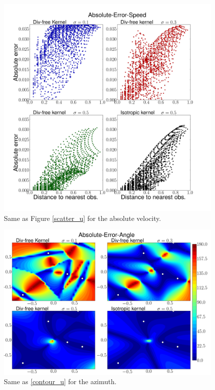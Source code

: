 \documentclass[12pt,a4paper]{article}%
\begin{document}
\begin{figure}
\noindent\includegraphics[width=36pc]{plots/Absolute-Error-Speed-scatter.png}
\caption{Same as Figure \ref{scatter_u} for the absolute velocity. }
\label{scatter_speed}
\end{figure}

\begin{figure}
\noindent\includegraphics[width=36pc]{plots/Absolute-Error-Angle-contour.png}
\caption{Same as \ref{contour_u} for the azimuth. }
\label{contour_angle}
\end{figure}
\end{document}
